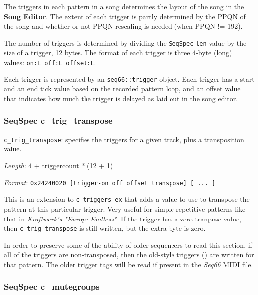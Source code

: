    The triggers in each pattern in a song determines the layout of the song in 
   the \textbf{Song Editor}.
   The extent of each trigger is partly determined by the PPQN of the song and
   whether or not PPQN rescaling is needed (when PPQN != 192).

   The number of triggers is determined by dividing the
   \texttt{SeqSpec} \texttt{len}
   value by the size of a trigger, 12 bytes.
   The format of each trigger is three 4-byte (long)
   values: \texttt{on:L off:L offset:L}.

   Each trigger is represented by an \texttt{seq66::trigger} object.
   Each trigger has a start and an end tick value based on the
   recorded pattern loop, and an offset value that indicates how much
   the trigger is delayed as laid out in the song editor.

\subsubsection{SeqSpec c\_trig\_transpose}
\label{subsubsec:midi_format_track_seqspec_trig_transpose}


   \begin{description}
      \item \texttt{c\_trig\_transpose}: specifies the triggers for a given
         track, plus a transposition value.
      \item \textsl{Length}: 4 + triggercount * (12 + 1)
      \item \textsl{Format}: \texttt{0x24240020 [trigger-on off offset transpose]
         [ ... ]}
   \end{description}

   This is an extension to \texttt{c\_triggers\_ex} that adds a value to use to
   transpose the pattern at this particular trigger.
   Very useful for simple repetitive patterns like that in
   \textsl{Kraftwerk's "Europe Endless"}.
   If the trigger has a zero tranpose value, then 
   \texttt{c\_trig\_transpose} is still written, but the extra byte is zero.

   In order to preserve some of the ability of older sequencers to read this
   section, if all of the triggers are non-transposed, then the old-style
   triggers () are written for that pattern.
   The older trigger tags will be read if
   present in the \textsl{Seq66} MIDI file.

\subsubsection{SeqSpec c\_mutegroups}
\label{subsubsec:midi_format_track_seqspec_mutegroups}

